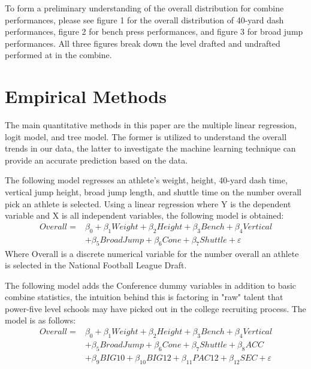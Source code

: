 \documentclass[12pt,english]{article}
\begin{document}
To form a preliminary understanding of the overall distribution for combine performances, please see figure 1 for the overall distribution of 40-yard dash performances, figure 2 for bench press performances, and figure 3 for broad jump performances. All three figures break down the level drafted and undrafted performed at in the combine.

\section{Empirical Methods}\label{sec:methods}
The main quantitative methods in this paper are the multiple linear regression, logit model, and tree model. The former is utilized to understand the overall trends in our data, the latter to investigate the machine learning technique can provide an accurate prediction based on the data. 

The following model regresses an athlete’s weight, height, 40-yard dash time, vertical jump height, broad jump length, and shuttle time on the number overall pick an athlete is selected. Using a linear regression where Y is the dependent variable and X is all independent variables, the following model is obtained:
\begin{equation}
\label{eq:1}
\begin{split}
    Overall = & \beta_{0} + \beta_{1}Weight + \beta_{2}Height + \beta_{3}Bench + \beta_{4}Vertical \\ & + \beta_{5}BroadJump + \beta_{6}Cone + \beta_{7}Shuttle + \varepsilon
\end{split}
\end{equation}
Where Overall is a discrete numerical variable for the number overall an athlete is selected in the National Football League Draft. 

The following model adds the Conference dummy variables in addition to basic combine statistics, the intuition behind this is factoring in "raw" talent that power-five level schools may have picked out in the college recruiting process. The model is as follows:
\begin{equation}
\label{eq:2}
\begin{split}
    Overall = & \beta_{0} + \beta_{1}Weight + \beta_{2}Height + \beta_{3}Bench + \beta_{4}Vertical \\ & + \beta_{5}BroadJump + \beta_{6}Cone + \beta_{7}Shuttle + \beta_{8}ACC \\ & + \beta_{9}BIG10 + \beta_{10}BIG12 + \beta_{11}PAC12 + \beta_{12}SEC + \varepsilon
\end{split}
\end{equation}
\end{document}
